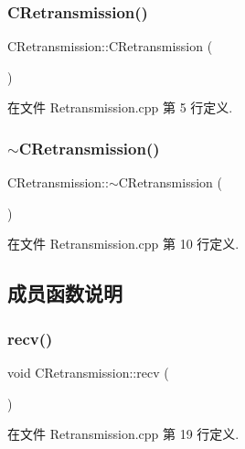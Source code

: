 \subsubsection{\texorpdfstring{C\+Retransmission()}{CRetransmission()}}
{\footnotesize\ttfamily C\+Retransmission\+::\+C\+Retransmission (\begin{DoxyParamCaption}{ }\end{DoxyParamCaption})}



在文件 Retransmission.\+cpp 第 5 行定义.

\mbox{\label{class_c_retransmission_aba5baf50f86cf183e780add3562dfeca}} 
\subsubsection{\texorpdfstring{$\sim$\+C\+Retransmission()}{~CRetransmission()}}
{\footnotesize\ttfamily C\+Retransmission\+::$\sim$\+C\+Retransmission (\begin{DoxyParamCaption}{ }\end{DoxyParamCaption})}



在文件 Retransmission.\+cpp 第 10 行定义.



\subsection{成员函数说明}
\mbox{\label{class_c_retransmission_afd36095dafeb4a237e0b6f7c68bb989b}} 
\subsubsection{\texorpdfstring{recv()}{recv()}}
{\footnotesize\ttfamily void C\+Retransmission\+::recv (\begin{DoxyParamCaption}{ }\end{DoxyParamCaption})\hspace{0.3cm}{\ttfamily [virtual]}}



在文件 Retransmission.\+cpp 第 19 行定义.

